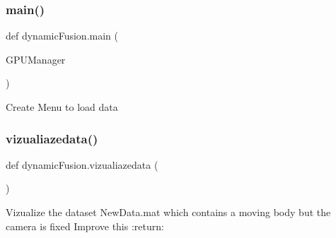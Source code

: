 \subsubsection{\texorpdfstring{main()}{main()}}
{\footnotesize\ttfamily def dynamic\+Fusion.\+main (\begin{DoxyParamCaption}\item[{}]{G\+P\+U\+Manager }\end{DoxyParamCaption})}

\begin{DoxyVerb}Create Menu to load data \end{DoxyVerb}
 \mbox{\label{namespacedynamic_fusion_a10b565077b2ce16f2ca380fb8b634fa1}} 
\subsubsection{\texorpdfstring{vizualiazedata()}{vizualiazedata()}}
{\footnotesize\ttfamily def dynamic\+Fusion.\+vizualiazedata (\begin{DoxyParamCaption}{ }\end{DoxyParamCaption})}

\begin{DoxyVerb}Vizualize the dataset NewData.mat which contains a moving body but the camera is fixed
Improve this
:return:
\end{DoxyVerb}
 
